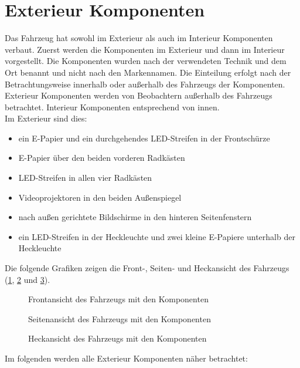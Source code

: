 \section{Exterieur Komponenten}
Das Fahrzeug hat sowohl im Exterieur als auch im Interieur Komponenten verbaut. Zuerst werden die Komponenten im Exterieur und dann im Interieur vorgestellt. Die Komponenten wurden nach der verwendeten Technik und dem Ort benannt und nicht nach den Markennamen. Die Einteilung erfolgt nach der Betrachtungsweise innerhalb oder außerhalb des Fahrzeugs der Komponenten. Exterieur Komponenten werden von Beobachtern außerhalb des Fahrzeugs betrachtet. Interieur Komponenten entsprechend von innen.\\
Im Exterieur sind dies:
\begin{itemize}
	\item ein E-Papier und ein durchgehendes LED-Streifen in der Frontschürze
	\item E-Papier über den beiden vorderen Radkästen
	\item LED-Streifen in allen vier Radkästen
	\item Videoprojektoren in den beiden Außenspiegel
	\item nach außen gerichtete Bildschirme in den hinteren Seitenfenstern
	\item ein LED-Streifen in der Heckleuchte und zwei kleine E-Papiere unterhalb der Heckleuchte
\end{itemize}
Die folgende Grafiken zeigen die Front-, Seiten- und Heckansicht des Fahrzeugs (\ref{fig:frontansicht}, \ref{fig:seitansicht} und \ref{fig:heckansicht}).
\begin{figure}[hbt]
	\centering
	
	\caption[Frontansicht des Fahrzeugs mit den Komponenten]{Frontansicht des Fahrzeugs mit den Komponenten}
	\label{fig:frontansicht}
\end{figure}
\begin{figure}[hbt]
	\centering
	
	\caption[Seitenansicht des Fahrzeugs mit den Komponenten]{Seitenansicht des Fahrzeugs mit den Komponenten}
	\label{fig:seitansicht}
\end{figure}
\begin{figure}[hbt]
	\centering
	
	\caption[Heckansicht des Fahrzeugs mit den Komponenten]{Heckansicht des Fahrzeugs mit den Komponenten}
	\label{fig:heckansicht}
\end{figure}
Im folgenden werden alle Exterieur Komponenten näher betrachtet:
